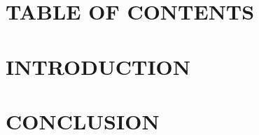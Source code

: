 \documentclass[12pt,a4paper,notitlepage]{article}
\begin{document}
\newpage
\section*{\Large TABLE OF CONTENTS}
\makeatletter
{}
\makeatother
\newpage

\section{\Large INTRODUCTION}





\section{\Large CONCLUSION}



\end{document}
